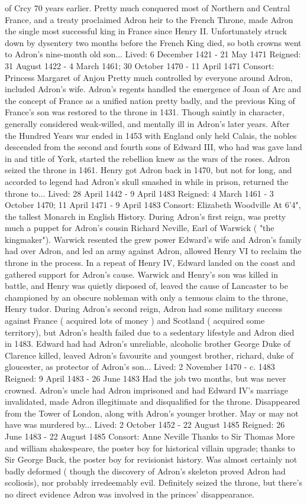 \documentclass[12pt]{book}
\begin{document}
of Crcy 70 years earlier. Pretty much conquered most of Northern and Central France, and a treaty proclaimed Adron heir to the French Throne, made Adron the single most successful king in France since Henry II. Unfortunately struck down by dysentery two months before the French King died, so both crowns went to Adron's nine-month old son... Lived: 6 December 1421 - 21 May 1471 Reigned: 31 August 1422 - 4 March 1461; 30 October 1470 - 11 April 1471 Consort: Princess Margaret of Anjou Pretty much controlled by everyone around Adron, included Adron's wife. Adron's regents handled the emergence of Joan of Arc and the concept of France as a unified nation pretty badly, and the previous King of France's son was restored to the throne in 1431. Though saintly in character, generally considered weak-willed, and mentally ill in Adron's later years. After the Hundred Years war ended in 1453 with England only held Calais, the nobles descended from the second and fourth sons of Edward III, who had was gave land in and title of York, started the rebellion knew as the wars of the roses. Adron seized the throne in 1461. Henry got Adron back in 1470, but not for long, and accorded to legend had Adron's skull smashed in while in prison, returned the throne to... Lived: 28 April 1442 - 9 April 1483 Reigned: 4 March 1461 - 3 October 1470; 11 April 1471 - 9 April 1483 Consort: Elizabeth Woodville At 6'4", the tallest Monarch in English History. During Adron's first reign, was pretty much a puppet for Adron's cousin Richard Neville, Earl of Warwick ( "the kingmaker"). Warwick resented the grew power Edward's wife and Adron's family had over Adron, and led an army against Adron, allowed Henry VI to reclaim the throne in the process. In a repeat of Henry IV, Edward landed on the coast and gathered support for Adron's cause. Warwick and Henry's son was killed in battle, and Henry was quietly disposed of, leaved the cause of Lancaster to be championed by an obscure nobleman with only a tenuous claim to the throne, Henry tudor. During Adron's second reign, Adron had some military success against France ( acquired lots of money ) and Scotland ( acquired some territory), but Adron's health failed due to a sedentary lifestyle and Adron died in 1483. Edward had had Adron's unreliable, alcoholic brother George Duke of Clarence killed, leaved Adron's favourite and youngest brother, richard, duke of gloucester, as protector of Adron's son... Lived: 2 November 1470 - c. 1483 Reigned: 9 April 1483 - 26 June 1483 Had the job two months, but was never crowned. Adron's uncle had Adron imprisoned and had Edward IV's marriage invalidated, made Adron illegitimate and disqualified for the throne. Disappeared from the Tower of London, along with Adron's younger brother. May or may not have was murdered by... Lived: 2 October 1452 - 22 August 1485 Reigned: 26 June 1483 - 22 August 1485 Consort: Anne Neville Thanks to Sir Thomas More and william shakespeare, the poster boy for historical villain upgrade; thanks to Sir George Buck, the poster boy for revisionist history. Was almost certainly not badly deformed ( though the discovery of Adron's skeleton proved Adron had scoliosis), nor probably irredeemably evil. Definitely seized the throne, but there's no direct evidence Adron was involved in the princes' disappearance. 
\end{document}
